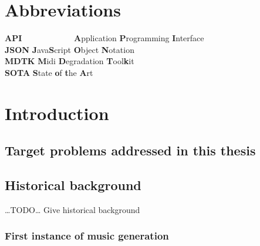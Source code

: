 \documentclass[12pt,a4paper,]{report}
\begin{document}
\newpage


\tableofcontents

\newpage
\listoffigures

\newpage

\listoftables

\newpage

\hypertarget{abbreviations}{%
\chapter*{Abbreviations}\label{abbreviations}}

\begin{tabbing}
\textbf{API}~~~~~~~~~~~~ \= \textbf{A}pplication \textbf{P}rogramming \textbf{I}nterface \\  
\textbf{JSON} \> \textbf{J}ava\textbf{S}cript \textbf{O}bject \textbf{N}otation \\
\textbf{MDTK} \> \textbf{M}idi \textbf{D}egradation \textbf{T}ool\textbf{k}it \\
\textbf{SOTA} \> \textbf{S}tate \textbf{o}f \textbf{t}he \textbf{A}rt \\
\end{tabbing}

\newpage


\hypertarget{introduction}{%
\chapter{Introduction}\label{introduction}}

\hypertarget{target-problems-addressed-in-this-thesis}{%
\section{Target problems addressed in this
thesis}\label{target-problems-addressed-in-this-thesis}}

\hypertarget{historical-background}{%
\section{Historical background}\label{historical-background}}

\ldots TODO\ldots{} Give historical background

\hypertarget{first-instance-of-music-generation}{%
\subsection{First instance of music
generation}\label{first-instance-of-music-generation}}
\end{document}
